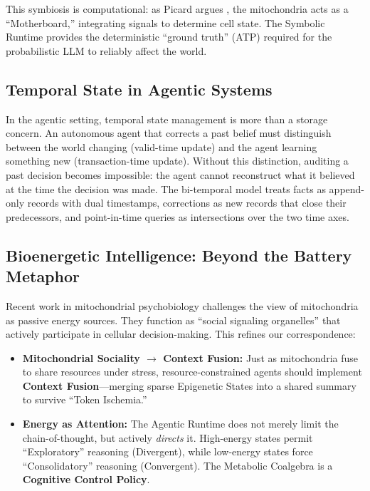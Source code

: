 This symbiosis is computational: as Picard argues \cite{picard2022mips}, the mitochondria acts as a ``Motherboard,''
integrating signals to determine cell state. The Symbolic Runtime provides the deterministic ``ground truth'' (ATP)
required for the probabilistic LLM to reliably affect the world.

\subsection{Temporal State in Agentic Systems}

In the agentic setting, temporal state management is more than a storage concern. An autonomous agent that corrects a past belief must distinguish between the world changing (valid-time update) and the agent learning something new (transaction-time update). Without this distinction, auditing a past decision becomes impossible: the agent cannot reconstruct what it believed at the time the decision was made. The bi-temporal model treats facts as append-only records with dual timestamps, corrections as new records that close their predecessors, and point-in-time queries as intersections over the two time axes.

\subsection{Bioenergetic Intelligence: Beyond the Battery Metaphor}

Recent work in mitochondrial psychobiology \cite{allen2022energy, picard2022signaling} challenges the view of
mitochondria as passive energy sources. They function as ``social signaling organelles'' that actively participate
in cellular decision-making. This refines our correspondence:
\begin{itemize}[leftmargin=*]
\item \textbf{Mitochondrial Sociality $\to$ Context Fusion:} Just as mitochondria fuse to share resources under
stress, resource-constrained agents should implement \textbf{Context Fusion}---merging sparse Epigenetic States
into a shared summary to survive ``Token Ischemia.''
\item \textbf{Energy as Attention:} The Agentic Runtime does not merely limit the chain-of-thought, but actively
\textit{directs} it. High-energy states permit ``Exploratory'' reasoning (Divergent), while low-energy states
force ``Consolidatory'' reasoning (Convergent). The Metabolic Coalgebra is a \textbf{Cognitive Control Policy}.
\end{itemize}


